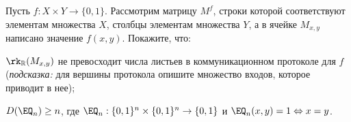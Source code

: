 Пусть $f: X \times Y \to \{0, 1\}$. Рассмотрим матрицу $M^f$, строки которой соответствуют элементам
множества $X$, столбцы элементам множества $Y$, а в ячейке $M_{x, y}$ написано значение $f(x,
y)$. Покажите, что:
\begin{enumcyr}
    \item $\rk_{\mathbb{R}}(M_{x, y})$ не превосходит числа листьев в коммуникационном протоколе для $f$
        (\textit{подсказка:} для вершины протокола опишите множество входов, которое приводит в нее);
    \item $D(\EQ_{n}) \ge n$, где $\EQ_{n}: \{0, 1\}^n \times \{0, 1\}^n \to \{0, 1\}$ и $\EQ_n(x, y) = 1
        \Leftrightarrow x = y$. 
\end{enumcyr}